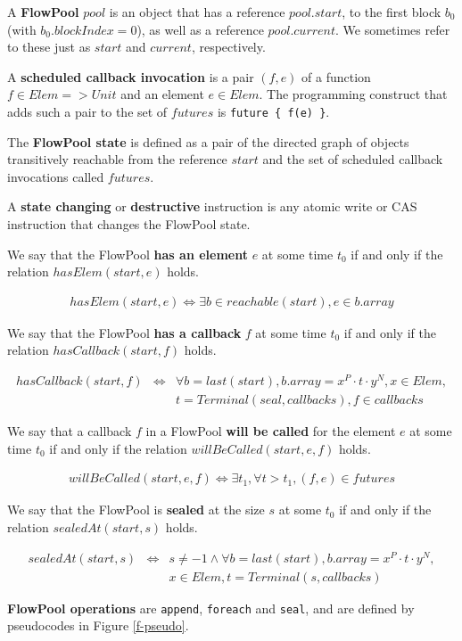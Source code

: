 \documentclass[runningheads,a4paper]{llncs}
\begin{document}
\begin{definition}[FlowPool]
A \textbf{FlowPool} $pool$ is an object that
has a reference $pool.start$, to the first block $b_0$ (with $b_0.blockIndex=0$), 
as well as a reference $pool.current$.
We sometimes refer to these just as $start$ and $current$, respectively.

A \textbf{scheduled callback invocation} is a pair $(f, e)$ of a function
$f \in Elem => Unit$ and an element $e \in Elem$.
The programming construct that adds such a pair to the set of
$futures$ is \verb=future { f(e) }=.

The \textbf{FlowPool state} is defined as a pair of the directed graph of
objects transitively reachable from the reference $start$ and the set
of scheduled callback invocations called $futures$.

A \textbf{state changing} or \textbf{destructive} instruction is any
atomic write or CAS instruction that changes the FlowPool state.

We say that the FlowPool \textbf{has an element} $e$ at some time
$t_0$ if and only if the relation $hasElem(start, e)$ holds.

\begin{eqnarray*}
hasElem(start, e) \Leftrightarrow \exists b \in reachable(start), e
\in b.array
\end{eqnarray*}

We say that the FlowPool \textbf{has a callback} $f$ at some time
$t_0$ if and only if the relation $hasCallback(start, f)$ holds.

\begin{eqnarray*}
hasCallback(start, f) &\Leftrightarrow& \forall b = last(start), b.array
= x^P \cdot t \cdot y^N, x \in Elem, \\
& & t = Terminal(seal, callbacks), f \in callbacks
\end{eqnarray*}

We say that a callback $f$ in a FlowPool \textbf{will be called} for
the element $e$ at some time $t_0$ if and only if the relation
$willBeCalled(start, e, f)$ holds.

\begin{eqnarray*}
willBeCalled(start, e, f) \Leftrightarrow \exists t_1, \forall t >
t_1, (f, e) \in futures
\end{eqnarray*}

We say that the FlowPool is \textbf{sealed} at the size $s$ at some
$t_0$ if and only if the relation $sealedAt(start, s)$ holds.

\begin{eqnarray*}
sealedAt(start, s) &\Leftrightarrow& s \neq -1 \wedge \forall b = last(start), b.array
= x^P \cdot t \cdot y^N, \\
& &x \in Elem, t = Terminal(s, callbacks)
\end{eqnarray*}

\textbf{FlowPool operations} are \verb=append=, \verb=foreach= and
\verb=seal=, and are defined by pseudocodes in Figure \ref{f-pseudo}.
\end{definition}
\end{document}
